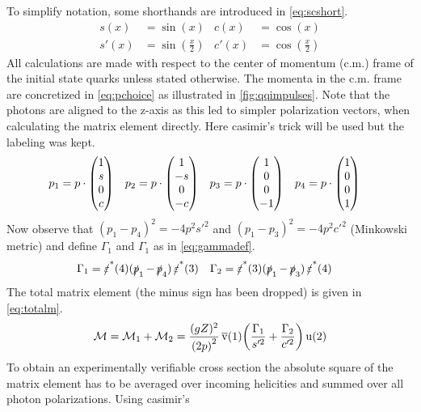 To simplify notation, some shorthands are introduced
in \cref{eq:scshort}.
\begin{equation}
  \label{eq:scshort}
  \begin{split}
    s(x) &= \sin(x) & c(x) &= \cos(x) \\ s'(x) &= \sin(\frac{x}{2}) & c'(x) &= \cos(\frac{x}{2})
  \end{split}
\end{equation}
%
All calculations are made with respect to the center of momentum
(c.m.) frame of the initial state quarks unless stated otherwise. The
momenta in the c.m. frame are concretized in \cref{eq:pchoice} as
illustrated in \cref{fig:qqimpulses}. Note that the photons are
aligned to the z-axis as this led to simpler polarization vectors,
when calculating the matrix element directly. Here casimir's trick
will be used but the labeling was kept.
%
\begin{align}
  \label{eq:pchoice}
  p_1&=p\cdot\mqty(1 \\ s \\ 0 \\ c)
     & p_2&=p\cdot\mqty(1 \\ -s \\ 0 \\ -c)
     & p_3&=p\cdot\mqty(1 \\ 0 \\ 0 \\ -1)
     & p_4&=p\cdot\mqty(1 \\ 0 \\ 0 \\ 1)
\end{align}
%
Now observe that \((p_1-p_4)^2=-4p^2s'^2\) and
\((p_1-p_3)^2=-4p^2c'^2\) (Minkowski metric) and define \(\Gamma_1\)
and \(\Gamma_1\) as in \cref{eq:gammadef}.
%
\begin{align}
  \label{eq:gammadef}
  \Gamma_1 &= \pses(4)(\ps_1 - \ps_4)\pses(3) &
  \Gamma_2 &= \pses(3)(\ps_1 - \ps_3)\pses(4)
\end{align}
%
The total matrix element (the minus sign has been dropped) is given in \cref{eq:totalm}.
\begin{equation}
  \label{eq:totalm}
  \mathcal{M} = \mathcal{M}_1 + \mathcal{M}_2 = \frac{(gZ)^2}{\qty(2p)^2}\operatorname*{\overline{v}}(1)\qty(\frac{\Gamma_1}{s'^2}+\frac{\Gamma_2}{c'^2})\operatorname{u}(2)
\end{equation}
%
To obtain an experimentally verifiable cross section the absolute
square of the matrix element has to be averaged over incoming
helicities and summed over all photon polarizations. Using casimir's
